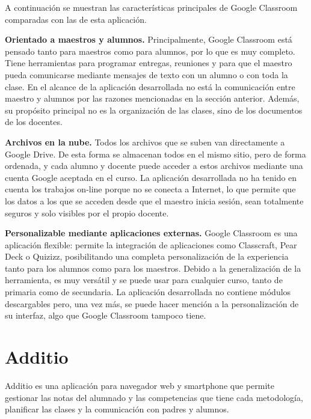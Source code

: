 A continuación se muestran las características principales de Google Classroom comparadas con las de esta aplicación.

\textbf {Orientado a maestros y alumnos.} Principalmente, Google Classroom está pensado tanto para maestros como para alumnos, por lo que es muy completo. Tiene herramientas para programar entregas, reuniones y para que el maestro pueda comunicarse mediante mensajes de texto con un alumno o con toda la clase. En el alcance de la aplicación desarrollada no está la comunicación entre maestro y alumnos por las razones mencionadas en la sección anterior. Además, su propósito principal no es la organización de las clases, sino de los documentos de los docentes.

\textbf {Archivos en la nube.} Todos los archivos que se suben van directamente a Google Drive. De esta forma se almacenan todos en el mismo sitio, pero de forma ordenada, y cada alumno y docente puede acceder a estos archivos mediante una cuenta Google aceptada en el curso. La aplicación desarrollada no ha tenido en cuenta los trabajos on-line porque no se conecta a Internet, lo que permite que los datos a los que se acceden desde que el maestro inicia sesión, sean totalmente seguros y solo visibles por el propio docente.

\textbf {Personalizable mediante aplicaciones externas.} Google Classroom es una aplicación flexible: permite la integración de aplicaciones como Classcraft, Pear Deck o Quizizz, posibilitando una completa personalización de la experiencia tanto para los alumnos como para los maestros. Debido a la generalización de la herramienta, es muy versátil y se puede usar para cualquier curso, tanto de primaria como de secundaria. La aplicación desarrollada no contiene módulos descargables pero, una vez más, se puede hacer mención a la personalización de su interfaz, algo que Google Classroom tampoco tiene.
	

\section{Additio}
\label{sec:additio}

Additio es una aplicación para navegador web y smartphone\cite{additio} que permite gestionar las notas del alumnado y las competencias que tiene cada metodología, planificar las clases y la comunicación con padres y alumnos.

